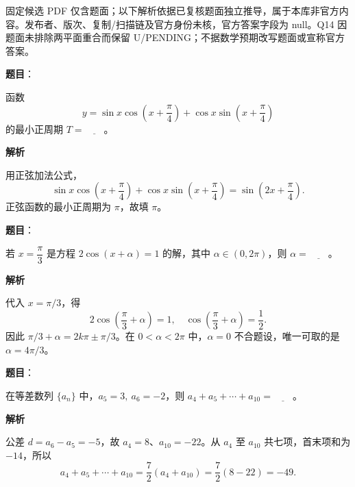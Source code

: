 

\begin{gktip}
固定候选 PDF 仅含题面；以下解析依据已复核题面独立推导，属于本库非官方内容。发布者、版次、复制/扫描链及官方身份未核，官方答案字段为 null。Q14 因题面未排除两平面重合而保留 U/PENDING；不据数学预期改写题面或宣称官方答案。
\end{gktip}


\begin{answer}

\textbf{题目}：

函数
\nopagebreak[4]
\[
   y=\sin x\cos\left(x+\frac{\pi}{4}\right)+\cos x\sin\left(x+\frac{\pi}{4}\right)
\]
   的最小正周期 \(T=\underline{\qquad}\)。

\textbf{解析}

用正弦加法公式，
\nopagebreak[4]
\[
\sin x\cos\left(x+\frac\pi4\right)+\cos x\sin\left(x+\frac\pi4\right)
=\sin\left(2x+\frac\pi4\right).
\]
正弦函数的最小正周期为 \(\pi\)，故填 \(\pi\)。


\end{answer}
\begin{answer}

\textbf{题目}：

若 \(x=\dfrac{\pi}{3}\) 是方程 \(2\cos(x+\alpha)=1\) 的解，其中 \(\alpha\in(0,2\pi)\)，则 \(\alpha=\underline{\qquad}\)。

\textbf{解析}

代入 \(x=\pi/3\)，得
\nopagebreak[4]
\[
2\cos\left(\frac\pi3+\alpha\right)=1,
\quad \cos\left(\frac\pi3+\alpha\right)=\frac12.
\]
因此 \(\pi/3+\alpha=2k\pi\pm\pi/3\)。在 \(0<\alpha<2\pi\) 中，\(\alpha=0\) 不合题设，唯一可取的是 \(\alpha=4\pi/3\)。


\end{answer}
\begin{answer}

\textbf{题目}：

在等差数列 \(\{a_n\}\) 中，\(a_5=3,\ a_6=-2\)，则 \(a_4+a_5+\cdots+a_{10}=\underline{\qquad}\)。

\textbf{解析}

公差 \(d=a_6-a_5=-5\)，故 \(a_4=8\)、\(a_{10}=-22\)。从 \(a_4\) 至 \(a_{10}\) 共七项，首末项和为 \(-14\)，所以
\nopagebreak[4]
\[
a_4+a_5+\cdots+a_{10}=\frac72(a_4+a_{10})=\frac72(8-22)=-49.
\]


\end{answer}
